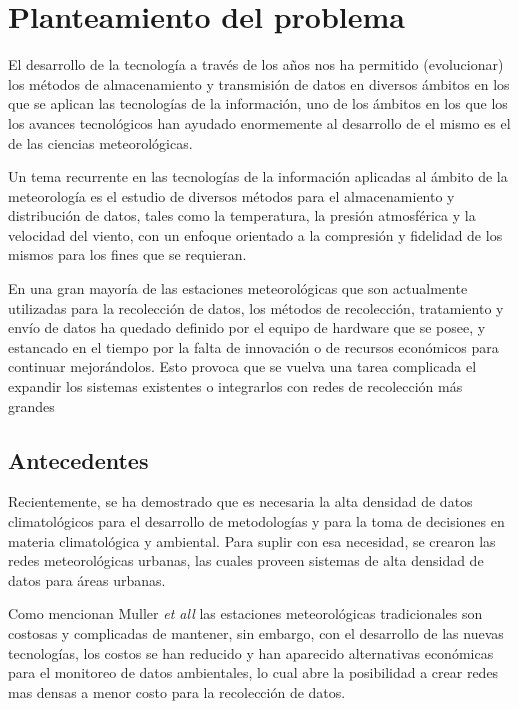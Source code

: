 \section{Planteamiento del problema}

El desarrollo de la tecnología a través de los años nos ha permitido (evolucionar) los métodos de almacenamiento y transmisión de datos en diversos ámbitos en los que se aplican las tecnologías de la información, uno de los ámbitos en los que los los avances tecnológicos han ayudado enormemente al desarrollo de el mismo es el de las ciencias meteorológicas.

Un tema recurrente en las tecnologías de la información aplicadas al ámbito de la meteorología es el estudio de diversos métodos para el almacenamiento y distribución de datos, tales como la temperatura, la presión atmosférica y la velocidad del viento, con un enfoque orientado a la compresión y fidelidad de los mismos para los fines que se requieran.

En una gran mayoría de las estaciones meteorológicas que son actualmente utilizadas para la recolección de datos, los métodos de recolección, tratamiento y envío de datos ha quedado definido por el equipo de hardware que se posee, y estancado en el tiempo por la falta de innovación o de recursos económicos para continuar mejorándolos. Esto provoca que se vuelva una tarea complicada el expandir los sistemas existentes o integrarlos con redes de recolección más grandes


\subsection{Antecedentes}

Recientemente, se ha demostrado que es necesaria la alta densidad de datos climatológicos \cite{warren2016birmingham} para el desarrollo de metodologías y para la toma de decisiones en materia climatológica y ambiental. Para suplir con esa necesidad, se crearon las redes meteorológicas urbanas, las cuales proveen sistemas de alta densidad de datos para áreas urbanas.

Como mencionan Muller \textit{et all} \cite{doi:10.1002/joc.3678} las estaciones meteorológicas tradicionales son costosas y complicadas de mantener, sin embargo, con el desarrollo de las nuevas tecnologías, los costos se han reducido y han aparecido alternativas económicas \cite{hernandezimplementacion} para el monitoreo de datos ambientales, lo cual abre la posibilidad a crear redes mas densas a menor costo para la recolección de datos.

